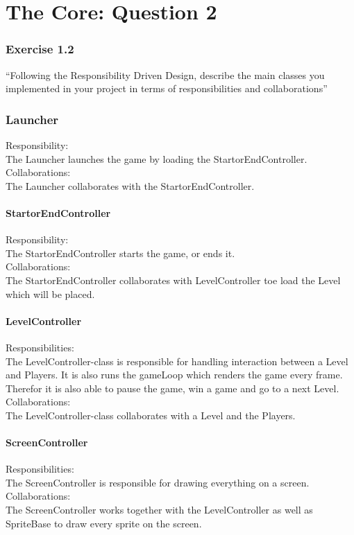 \chapter{The Core: Question 2}

\subsection{Exercise 1.2}
``Following the Responsibility Driven Design, describe the main classes you implemented in your project in terms of responsibilities and collaborations''

\subsection{Launcher}
Responsibility: \\
The Launcher launches the game by loading the StartorEndController. \\
Collaborations: \\
The Launcher collaborates with the StartorEndController. 

\subsubsection{StartorEndController}
Responsibility: \\
The StartorEndController starts the game, or ends it. \\
Collaborations: \\
The StartorEndController collaborates with LevelController toe load the Level which will be placed. 

\subsubsection{LevelController}
Responsibilities: \\
The LevelController-class is responsible for handling interaction between a Level and Players. It is also runs the gameLoop which renders the game every frame. Therefor it is also able to pause the game, win a game and go to a next Level. \\
Collaborations: \\
The LevelController-class collaborates with a Level and the Players.

\subsubsection{ScreenController}
Responsibilities: \\
The ScreenController is responsible for drawing everything on a screen. \\
Collaborations: \\
The ScreenController works together with the LevelController as well as SpriteBase to draw every sprite on the screen. 

